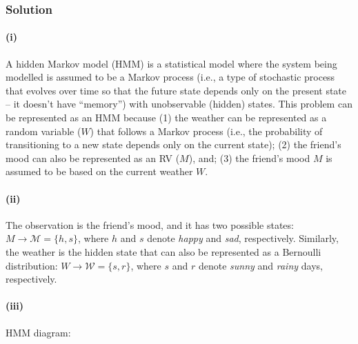 \subsubsection*{Solution}

\paragraph{(i)} A hidden Markov model (HMM) is a statistical model where the system being modelled is
assumed to be a Markov process (i.e., a type of stochastic process that evolves over time so
that the future state depends only on the present state – it doesn’t have “memory”) with
unobservable (hidden) states. This problem can be represented as an HMM because (1)
the weather can be represented as a random variable ($W$) that follows a Markov process
(i.e., the probability of transitioning to a new state depends only on the current state);
(2) the friend’s mood can also be represented as an RV ($M$), and; (3) the friend’s mood
$M$ is assumed to be based on the current weather $W$.

\paragraph{(ii)} The observation is the friend’s mood, and it has two possible states:
$M \rightarrow \mathcal{M}=\{h,s\}$, where $h$ and $s$ denote \emph{happy} and \emph{sad},
respectively.  Similarly, the weather is the hidden state that can also be represented as a
Bernoulli distribution: $W \rightarrow \mathcal{W}=\{s,r\}$, where $s$ and $r$ denote
\emph{sunny} and \emph{rainy} days, respectively.

\paragraph{(iii)} HMM diagram:

\begin{center}
\end{center}


